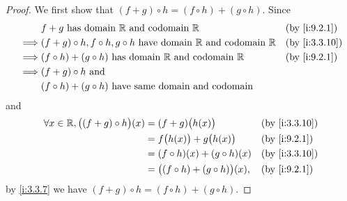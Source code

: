\begin{proof}
  We first show that \((f + g) \circ h = (f \circ h) + (g \circ h)\).
  Since
  \begin{align*}
             & f + g \text{ has domain } \R \text{ and codomain } \R                                   &  & \by{i:9.2.1}  \\
    \implies & (f + g) \circ h, f \circ h, g \circ h  \text{ have domain } \R \text{ and codomain } \R &  & \by{i:3.3.10} \\
    \implies & (f \circ h) + (g \circ h)  \text{ has domain } \R \text{ and codomain } \R              &  & \by{i:9.2.1}  \\
    \implies & (f + g) \circ h \text{ and }                                                                               \\
             & (f \circ h) + (g \circ h) \text{ have same domain and codomain}
  \end{align*}
  and
  \begin{align*}
    \forall x \in \R, \big((f + g) \circ h\big)(x) & = (f + g)\big(h(x)\big)                   &  & \by{i:3.3.10} \\
                                                   & = f\big(h(x)\big) + g\big(h(x)\big)       &  & \by{i:9.2.1}  \\
                                                   & = (f \circ h)(x) + (g \circ h)(x)         &  & \by{i:3.3.10} \\
                                                   & = \big((f \circ h) + (g \circ h)\big)(x), &  & \by{i:9.2.1}
  \end{align*}
  by \cref{i:3.3.7} we have \((f + g) \circ h = (f \circ h) + (g \circ h)\).


\end{proof}
